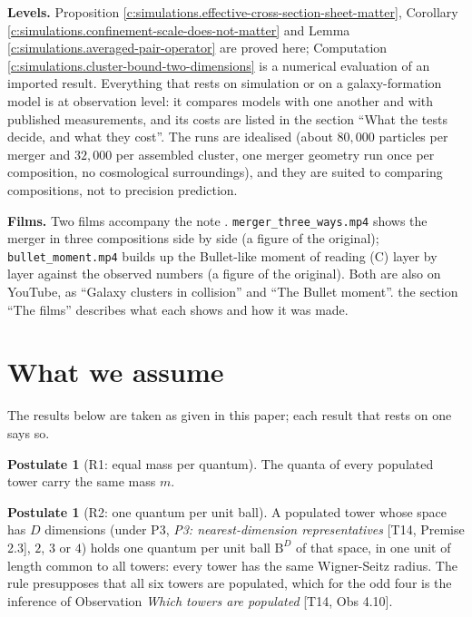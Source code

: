 \documentclass[11pt]{article}
\theoremstyle{definition}
\newtheorem{postulate}[theorem]{Postulate}
\theoremstyle{plain}
\providecommand{\B}{}\renewcommand{\B}{\mathrm{B}}
\providecommand{\file}{}\renewcommand{\file}[1]{\texttt{#1}}
\begin{document}
\label{c:note.simulations.setting-introduction-4}
\textbf{Levels.} Proposition \ref{c:simulations.effective-cross-section-sheet-matter}, Corollary \ref{c:simulations.confinement-scale-does-not-matter} and Lemma \ref{c:simulations.averaged-pair-operator} are proved here; Computation \ref{c:simulations.cluster-bound-two-dimensions} is a numerical evaluation of an imported result. Everything that rests on simulation or on a galaxy-formation model is at observation level: it compares models with one another and with published measurements, and its costs are listed in the section ``What the tests decide, and what they cost''. The runs are idealised (about $80{,}000$ particles per merger and $32{,}000$ per assembled cluster, one merger geometry run once per composition, no cosmological surroundings), and they are suited to comparing compositions, not to precision prediction.

\label{c:note.simulations.setting-introduction-5}
\textbf{Films.} Two films accompany the note \cite{ButlerSuppT14b}. \file{merger\_three\_ways.mp4} shows the merger in three compositions side by side (a figure of the original); \file{bullet\_moment.mp4} builds up the Bullet-like moment of reading (C) layer by layer against the observed numbers (a figure of the original). Both are also on YouTube, as ``Galaxy clusters in collision'' and ``The Bullet moment''. the section ``The films'' describes what each shows and how it was made.

\section*{What we assume}
The results below are taken as given in this paper; each result that rests on one says so.
\begin{postulate}[R1: equal mass per quantum]\label{c:dark-matter.r1-equal-mass-per-quantum}
The quanta of every populated tower carry the same mass $m$.
\end{postulate}

\begin{postulate}[R2: one quantum per unit ball]\label{c:dark-matter.r2-one-quantum-per-unit-ball}
A populated tower whose space has $D$ dimensions (under P3, \emph{P3: nearest-dimension representatives} [T14, Premise 2.3], $2$, $3$ or $4$) holds one quantum per unit ball $\B^{D}$ of that space, in one unit of length common to all towers: every tower has the same Wigner-Seitz radius. The rule presupposes that all six towers are populated, which for the odd four is the inference of Observation \emph{Which towers are populated} [T14, Obs 4.10].
\end{postulate}
\end{document}
